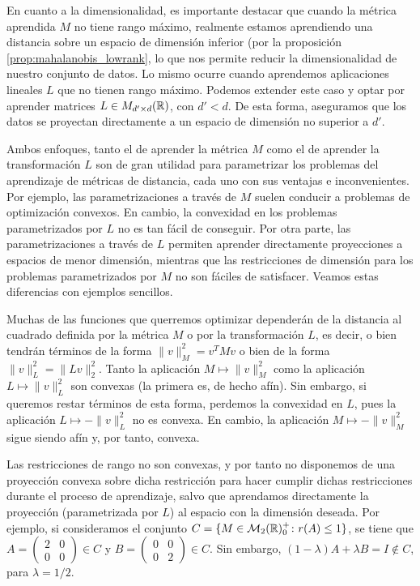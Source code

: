 \documentclass{book}
\begin{document}
	En cuanto a la dimensionalidad, es importante destacar que cuando la métrica aprendida $M$ no tiene rango máximo, realmente estamos aprendiendo una distancia sobre un espacio de dimensión inferior (por la proposición \ref{prop:mahalanobis_lowrank}, lo que nos permite reducir la dimensionalidad de nuestro conjunto de datos. Lo mismo ocurre cuando aprendemos aplicaciones lineales $L$ que no tienen rango máximo. Podemos extender este caso y optar por aprender matrices $L \in M_{d'\times d}(\mathbb{R})$, con $d' < d$. De esta forma, aseguramos que los datos se proyectan directamente a un espacio de dimensión no superior a $d'$.

	Ambos enfoques, tanto el de aprender la métrica $M$ como el de aprender la transformación $L$ son de gran utilidad para parametrizar los problemas del aprendizaje de métricas de distancia, cada uno con sus ventajas e inconvenientes. Por ejemplo, las parametrizaciones a través de $M$ suelen conducir a problemas de optimización convexos. En cambio, la convexidad en los problemas parametrizados por $L$ no es tan fácil de conseguir. Por otra parte, las parametrizaciones a través de $L$ permiten aprender directamente proyecciones a espacios de menor dimensión, mientras que las restricciones de dimensión para los problemas parametrizados por $M$ no son fáciles de satisfacer. Veamos estas diferencias con ejemplos sencillos.

	\begin{example}
		Muchas de las funciones que querremos optimizar dependerán de la distancia al cuadrado definida por la métrica $M$ o por la transformación $L$, es decir, o bien tendrán términos de la forma $\|v\|_M^2 = v^TMv$ o bien de la forma $\|v\|_L^2 = \|Lv\|_2^2$. Tanto la aplicación $M \mapsto \|v\|_M^2$ como la aplicación $L \mapsto \|v\|_L^2$ son convexas (la primera es, de hecho afín). Sin embargo, si queremos restar términos de esta forma, perdemos la convexidad en $L$, pues la aplicación $L \mapsto -\|v\|_L^2$ no es convexa. En cambio, la aplicación $M \mapsto -\|v\|_M^2$ sigue siendo afín y, por tanto, convexa.
	\end{example}

	\begin{example}
		Las restricciones de rango no son convexas, y por tanto no disponemos de una proyección convexa sobre dicha restricción para hacer cumplir dichas restricciones durante el proceso de aprendizaje, salvo que aprendamos directamente la proyección (parametrizada por $L$)  al espacio con la dimensión deseada. Por ejemplo, si consideramos el conjunto $C = \{ M \in \mathcal{M}_2(\mathbb{R})^+_0 \colon r(A) \le 1 \}$, se tiene que $A = \begin{pmatrix} 2 & 0 \\ 0 & 0 \end{pmatrix} \in C$ y $B = \begin{pmatrix} 0 & 0 \\ 0 & 2 \end{pmatrix} \in C$. Sin embargo, $(1-\lambda)A+\lambda B = I \notin C$, para $\lambda=1/2$. 
	\end{example}
\end{document}
